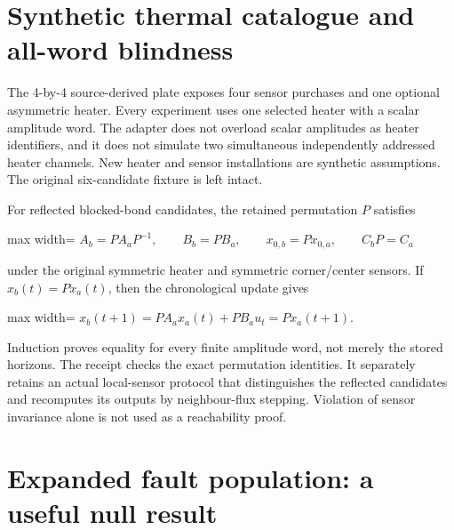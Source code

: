 \documentclass[
  11pt,
  a4paper,
]{report}
\begin{document}
\hypertarget{synthetic-thermal-catalogue-and-all-word-blindness}{%
\section{Synthetic thermal catalogue and all-word
blindness}\label{synthetic-thermal-catalogue-and-all-word-blindness}}

The 4-by-4 source-derived plate exposes four sensor purchases and one
optional asymmetric heater. Every experiment uses one selected heater
with a scalar amplitude word. The adapter does not overload scalar
amplitudes as heater identifiers, and it does not simulate two
simultaneous independently addressed heater channels. New heater and
sensor installations are synthetic assumptions. The original
six-candidate fixture is left intact.

For reflected blocked-bond candidates, the retained permutation \(P\)
satisfies

\begin{center}
\begin{adjustbox}{max width=\linewidth}
$\displaystyle
A_b=PA_aP^{-1},\qquad B_b=PB_a,\qquad x_{0,b}=Px_{0,a},\qquad C_bP=C_a
$
\end{adjustbox}
\end{center}

under the original symmetric heater and symmetric corner/center sensors.
If \(x_b(t)=Px_a(t)\), then the chronological update gives

\begin{center}
\begin{adjustbox}{max width=\linewidth}
$\displaystyle
x_b(t+1)=PA_ax_a(t)+PB_au_t=P x_a(t+1).
$
\end{adjustbox}
\end{center}

Induction proves equality for every finite amplitude word, not merely
the stored horizons. The receipt checks the exact permutation
identities. It separately retains an actual local-sensor protocol that
distinguishes the reflected candidates and recomputes its outputs by
neighbour-flux stepping. Violation of sensor invariance alone is not
used as a reachability proof.

\hypertarget{expanded-fault-population-a-useful-null-result}{%
\section{Expanded fault population: a useful null
result}\label{expanded-fault-population-a-useful-null-result}}
\end{document}
